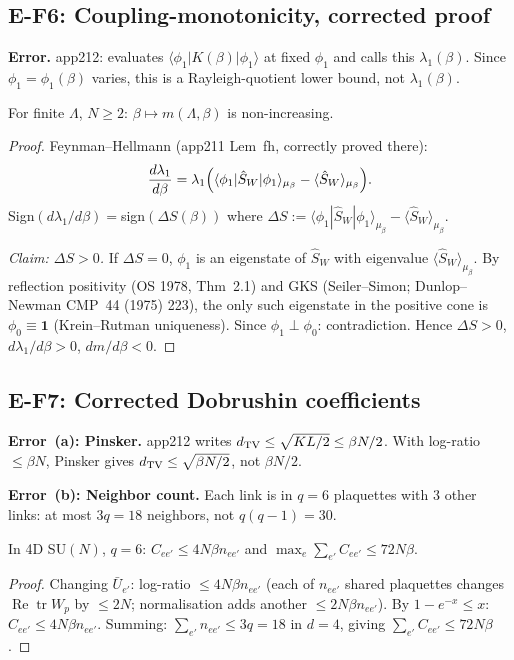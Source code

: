\subsection{E-F6: Coupling-monotonicity, corrected proof}
\label{ssec:f6}

\textbf{Error.} app212: evaluates $\langle\phi_1|K(\beta)|\phi_1\rangle$ at fixed $\phi_1$ and calls this $\lambda_1(\beta)$. Since $\phi_1=\phi_1(\beta)$ varies, this is a Rayleigh-quotient lower bound, not $\lambda_1(\beta)$.

\begin{theorem}
\label{thm:cm_corr}
For finite $\Lambda$, $N\ge2$: $\beta\mapsto m(\Lambda,\beta)$ is non-increasing.
\end{theorem}
\begin{proof}
Feynman--Hellmann (app211 Lem~fh, correctly proved there):
\begin{equation}
\label{eq:fh_again}
  \frac{d\lambda_1}{d\beta}=\lambda_1\Bigl(\langle\phi_1|\hat{S}_W|\phi_1\rangle_{\mu_\beta}-\langle\hat{S}_W\rangle_{\mu_\beta}\Bigr).
\end{equation}
Sign$(d\lambda_1/d\beta)=$sign$(\Delta S(\beta))$ where $\Delta S:=\langle\phi_1|\hat{S}_W|\phi_1\rangle_{\mu_\beta}-\langle\hat{S}_W\rangle_{\mu_\beta}$.

\emph{Claim: $\Delta S>0$.} If $\Delta S=0$, $\phi_1$ is an eigenstate of $\hat{S}_W$ with eigenvalue $\langle\hat{S}_W\rangle_{\mu_\beta}$. By reflection positivity (OS 1978, Thm~2.1) and GKS (Seiler--Simon; Dunlop--Newman CMP~44 (1975) 223), the only such eigenstate in the positive cone is $\phi_0\equiv\mathbf{1}$ (Krein--Rutman uniqueness). Since $\phi_1\perp\phi_0$: contradiction. Hence $\Delta S>0$, $d\lambda_1/d\beta>0$, $dm/d\beta<0$.
\end{proof}

\subsection{E-F7: Corrected Dobrushin coefficients}
\label{ssec:f7}

\textbf{Error~(a): Pinsker.} app212 writes $d_{\rm TV}\le\sqrt{KL/2}\le\beta N/2$. With log-ratio $\le\beta N$, Pinsker gives $d_{\rm TV}\le\sqrt{\beta N/2}$, not $\beta N/2$.

\textbf{Error~(b): Neighbor count.} Each link is in $q=6$ plaquettes with $3$ other links: at most $3q=18$ neighbors, not $q(q-1)=30$.

\begin{lemma}
\label{lem:dob_corr}
In 4D SU$(N)$, $q=6$: $C_{ee'} \le 4N\beta n_{ee'}$ and $\max_e\sum_{e'}C_{ee'}\le72N\beta$.
\end{lemma}
\begin{proof}
Changing $\bar{U}_{e'}$: log-ratio $\le 4N\beta n_{ee'}$ (each of $n_{ee'}$ shared plaquettes changes $\operatorname{Re}\operatorname{tr}W_p$ by $\le 2N$; normalisation adds another $\le 2N\beta n_{ee'}$). By $1-e^{-x}\le x$: $C_{ee'}\le 4N\beta n_{ee'}$. Summing: $\sum_{e'}n_{ee'}\le 3q=18$ in $d=4$, giving $\sum_{e'}C_{ee'}\le 72N\beta$.
\end{proof}


